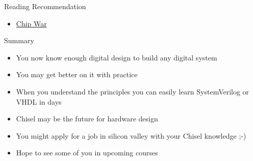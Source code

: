 \begin{frame}[fragile]{Reading Recommendation}
\begin{itemize}
\item \href{https://www.amazon.com/Chip-War-Worlds-Critical-Technology/dp/1982172002}{Chip War}
\end{itemize}
\end{frame}

\begin{frame}[fragile]{Summary}
\begin{itemize}
\item You now know enough digital design to build any digital system
\item You may get better on it with practice
\item When you understand the principles you can easily learn SystemVerilog or VHDL in days
\item Chisel may be the future for hardware design
\item You might apply for a job in silicon valley with your Chisel knowledge ;-)
\item Hope to see some of you in upcoming courses
\end{itemize}
\end{frame}





